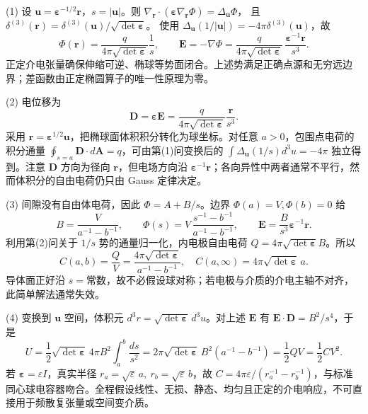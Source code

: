 (1) 设 \(\mathbf u=\boldsymbol\varepsilon^{-1/2}\mathbf r\)，\(s=|\mathbf u|\)。则
\(\nabla_{\mathbf r}\cdot(\boldsymbol\varepsilon\nabla_{\mathbf r}\Phi)=\Delta_{\mathbf u}\Phi\)，
且 \(\delta^{(3)}(\mathbf r)=\delta^{(3)}(\mathbf u)/\sqrt{\det\boldsymbol\varepsilon}\)。
使用 \(\Delta_{\mathbf u}(1/|\mathbf u|)=-4\pi\delta^{(3)}(\mathbf u)\)，故
\[
\Phi(\mathbf r)=\frac{q}{4\pi\sqrt{\det\boldsymbol\varepsilon}}\frac1s,\qquad
\mathbf E=-\nabla\Phi=
\frac{q}{4\pi\sqrt{\det\boldsymbol\varepsilon}}\,
\frac{\boldsymbol\varepsilon^{-1}\mathbf r}{s^3}.
\]
正定介电张量确保伸缩可逆、椭球等势面闭合。上述势满足正确点源和无穷远边界；差函数由正定椭圆算子的唯一性原理为零。

(2) 电位移为
\[
\mathbf D=\boldsymbol\varepsilon\mathbf E=
\frac{q}{4\pi\sqrt{\det\boldsymbol\varepsilon}}\frac{\mathbf r}{s^3}.
\]
采用 \(\mathbf r=\boldsymbol\varepsilon^{1/2}\mathbf u\)，把椭球面体积积分转化为球坐标。对任意 \(a>0\)，包围点电荷的积分通量
\(\oint_{s=a}\mathbf D\cdot d\mathbf A=q\)，可由第(1)问变换后的
\(\int\Delta_{\mathbf u}(1/s)d^3u=-4\pi\) 独立得到。注意 \(\mathbf D\) 方向为径向 \(\mathbf r\)，但电场方向沿
\(\boldsymbol\varepsilon^{-1}\mathbf r\)；各向异性中两者通常不平行，然而体积分的自由电荷仍只由 Gauss 定律决定。

(3) 间隙没有自由体电荷，因此 \(\Phi=A+B/s\)。边界 \(\Phi(a)=V,\Phi(b)=0\) 给
\[
B=\frac{V}{a^{-1}-b^{-1}},\qquad
\Phi(s)=V\,\frac{s^{-1}-b^{-1}}{a^{-1}-b^{-1}},\qquad
\mathbf E=\frac{B}{s^3}\boldsymbol\varepsilon^{-1}\mathbf r .
\]
利用第(2)问关于 \(1/s\) 势的通量归一化，内电极自由电荷
\(Q=4\pi\sqrt{\det\boldsymbol\varepsilon} B\)。所以
\[
C(a,b)=\frac{Q}{V}
=\frac{4\pi\sqrt{\det\boldsymbol\varepsilon}}{a^{-1}-b^{-1}},
\quad
C(a,\infty)=4\pi\sqrt{\det\boldsymbol\varepsilon}\,a.
\]
导体面正好沿 \(s=\text{常数}\)，故不必假设球对称；若电极与介质的介电主轴不对齐，此简单解法通常失效。

(4) 变换到 \(\mathbf u\) 空间，体积元 \(d^3r=\sqrt{\det\boldsymbol\varepsilon}\,d^3u\)。对上述 \(\mathbf E\) 有
\(\mathbf E\cdot\mathbf D=B^2/s^4\)，于是
\[
U=\frac12\sqrt{\det\boldsymbol\varepsilon}\,4\pi B^2
\int_a^b\frac{ds}{s^2}
=2\pi\sqrt{\det\boldsymbol\varepsilon}\,B^2(a^{-1}-b^{-1})
=\frac12 QV=\frac12 CV^2.
\]
若 \(\boldsymbol\varepsilon=\varepsilon I\)，真实半径 \(r_a=\sqrt\varepsilon\,a,\ r_b=\sqrt\varepsilon\,b\)，故
\(C=4\pi\varepsilon/(r_a^{-1}-r_b^{-1})\)，与标准同心球电容器吻合。全程假设线性、无损、静态、均匀且正定的介电响应，不可直接用于频散复张量或空间变介质。
